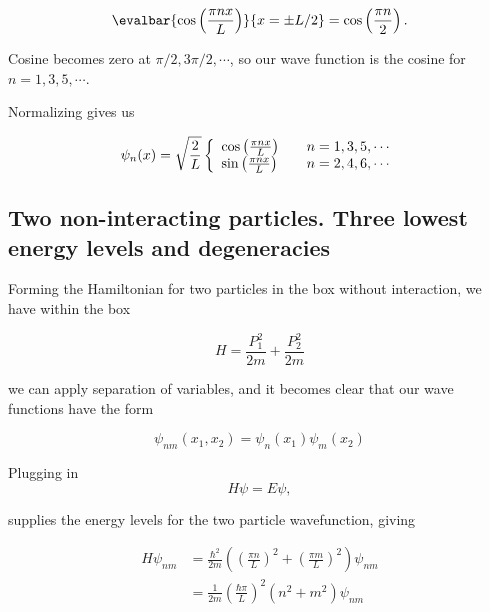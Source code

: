 \begin{equation}\label{eqn:qmTwoPs4:210}
\evalbar{\cos\left( \frac{\pi n x }{L} \right) }{x = \pm L/2} = 
\cos\left(\frac{\pi n}{2}\right).
\end{equation}

Cosine becomes zero at $\pi/2, 3\pi/2, \cdots$, so our wave function is the cosine for $n = 1, 3, 5, \cdots$.

Normalizing gives us

\begin{equation}\label{eqn:qmTwoPs4:230}
\psi_n(x) = \sqrt{\frac{2}{L}}
\left\{
\begin{array}{l l}
\cos\left(\frac{\pi n x}{L}\right) & \quad n = 1, 3, 5, \cdots \\
\sin\left(\frac{\pi n x}{L}\right) & \quad n = 2, 4, 6, \cdots 
\end{array}
\right.
\end{equation}

\subsection{Two non-interacting particles.  Three lowest energy levels and degeneracies}

Forming the Hamiltonian for two particles in the box without interaction, we have within the box

\begin{equation}\label{eqn:qmTwoPs4:250}
H = 
\frac{P_1^2}{2m} 
+\frac{P_2^2}{2m} 
\end{equation}

we can apply separation of variables, and it becomes clear that our wave functions have the form

\begin{equation}\label{eqn:qmTwoPs4:270}
\psi_{nm}(x_1, x_2) = \psi_n(x_1) \psi_m(x_2)
\end{equation}

Plugging in
\begin{equation}\label{eqn:qmTwoPs4:290}
H \psi = E \psi,
\end{equation}

supplies the energy levels for the two particle wavefunction, giving

\begin{equation}\label{eqn:qmTwoPs4:310}
\begin{aligned}
H \psi_{nm} 
&= 
\frac{\hbar^2}{2m}
\left(
\left(\frac{\pi n}{L}\right)^2
+\left(\frac{\pi m}{L}\right)^2
\right)
\psi_{nm} \\
&= 
\frac{1}{2m} \left(\frac{\hbar \pi}{L}\right)^2 ( n^2 + m^2 ) \psi_{nm}
\end{aligned}
\end{equation}

